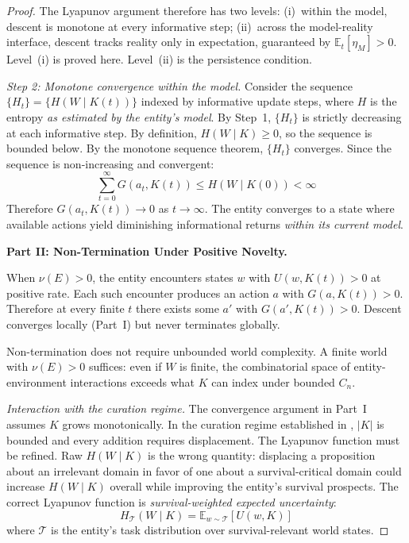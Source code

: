 \documentclass[11pt]{article}
\theoremstyle{definition}
\theoremstyle{remark}
\begin{document}
\begin{proof}
The Lyapunov argument therefore has two levels: (i)~within the model,
descent is monotone at every informative step; (ii)~across the
model-reality interface, descent tracks reality only in expectation,
guaranteed by $\mathbb{E}_t[\eta_M] > 0$. Level~(i) is proved here.
Level~(ii) is the persistence condition.

\emph{Step 2: Monotone convergence within the model.} Consider the
sequence $\{H_t\} = \{H(W \mid K(t))\}$ indexed by informative update
steps, where $H$ is the entropy \emph{as estimated by the entity's
model}. By Step~1, $\{H_t\}$ is strictly decreasing at each
informative step. By definition, $H(W \mid K) \geq 0$, so the sequence
is bounded below. By the monotone sequence theorem, $\{H_t\}$
converges. Since the sequence is non-increasing and convergent:
\[
\sum_{t=0}^{\infty} G(a_t, K(t)) \leq H(W \mid K(0)) < \infty
\]
Therefore $G(a_t, K(t)) \to 0$ as $t \to \infty$. The entity
converges to a state where available actions yield diminishing
informational returns \emph{within its current model}.

\textbf{Part II: Non-Termination Under Positive Novelty.}

When $\nu(E) > 0$, the entity encounters states $w$ with
$U(w, K(t)) > 0$ at positive rate. Each such encounter produces an
action $a$ with $G(a, K(t)) > 0$. Therefore at every finite $t$ there
exists some $a'$ with $G(a', K(t)) > 0$. Descent converges locally
(Part~I) but never terminates globally.

Non-termination does not require unbounded world complexity. A finite
world with $\nu(E) > 0$ suffices: even if $W$ is finite, the
combinatorial space of entity-environment interactions exceeds what $K$
can index under bounded $C_n$.

\emph{Interaction with the curation regime.} The convergence argument
in Part~I assumes $K$ grows monotonically. In
the curation regime established in \cite{McCarthy2026b}, $|K|$ is
bounded and every addition requires displacement. The
Lyapunov function must be refined. Raw $H(W \mid K)$ is the wrong
quantity: displacing a proposition about an irrelevant domain in favor
of one about a survival-critical domain could increase $H(W \mid K)$
overall while improving the entity's survival prospects. The correct
Lyapunov function is \emph{survival-weighted expected uncertainty}:
\[
H_{\mathcal{T}}(W \mid K) = \mathbb{E}_{w \sim \mathcal{T}}[U(w, K)]
\]
where $\mathcal{T}$ is the entity's task distribution over
survival-relevant world states.


\end{proof}
\end{document}
